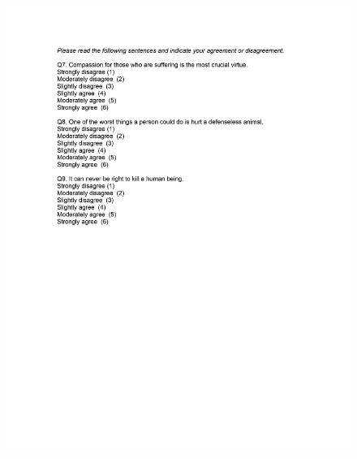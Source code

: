 \documentclass[12pt,econ]{sources/authesis}
\makeatletter
\def\maxwidth{\ifdim\Gin@nat@width>\linewidth\linewidth
\else\Gin@nat@width\fi}
\let\Oldincludegraphics\includegraphics
\renewcommand{\includegraphics}[1]{\Oldincludegraphics[width=\maxwidth]{#1}}
\makeatother
\begin{document}
\begin{figure}[hbt]
  \centering
\includegraphics{data/framing/appendix/questionnaire/questionnaire05.jpg}
\end{figure}
\end{document}
